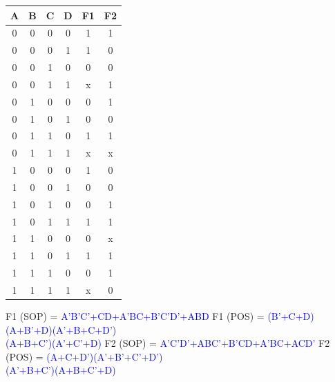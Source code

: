 \documentclass{article}
\begin{document}
\begin{enumerate}[label=(\alph*)]
        \begin{multicols}{2}
        \begin{center}
        \scalebox{1.2} {
            \begin{tabular}{|c|c|c|c||c|c|}
            \hline
            A & B & C & D & F1 & F2 \\
            \hline
            0 & 0 & 0 & 0 & 1 & 1 \\
            0 & 0 & 0 & 1 & 1 & 0 \\
            0 & 0 & 1 & 0 & 0 & 0 \\
            0 & 0 & 1 & 1 & x & 1 \\
            0 & 1 & 0 & 0 & 0 & 1 \\
            0 & 1 & 0 & 1 & 0 & 0 \\
            0 & 1 & 1 & 0 & 1 & 1 \\
            0 & 1 & 1 & 1 & x & x \\
            1 & 0 & 0 & 0 & 1 & 0 \\
            1 & 0 & 0 & 1 & 0 & 0 \\
            1 & 0 & 1 & 0 & 0 & 1 \\
            1 & 0 & 1 & 1 & 1 & 1 \\
            1 & 1 & 0 & 0 & 0 & x \\
            1 & 1 & 0 & 1 & 1 & 1 \\
            1 & 1 & 1 & 0 & 0 & 1 \\
            1 & 1 & 1 & 1 & x & 0 \\
            \hline
            \end{tabular}
        }
        \end{center}
        \columnbreak
        F1 (SOP) = \textcolor{blue}{A'B'C'+CD+A'BC+B'C'D'+ABD}
        \newline
        \newline
        F1 (POS) = \textcolor{blue}{(B'+C+D)(A+B'+D)(A'+B+C+D')\\ (A+B+C')(A'+C'+D)}
        \newline
        \newline
        F2 (SOP) = \textcolor{blue}{A'C'D'+ABC'+B'CD+A'BC+ACD'}
        \newline
        \newline
        F2 (POS) = \textcolor{blue}{(A+C+D')(A'+B'+C'+D')\\(A'+B+C')(A+B+C'+D)}
        \newline
        \newline
        \end{multicols}
    \newpage
\end{enumerate}
\end{document}
